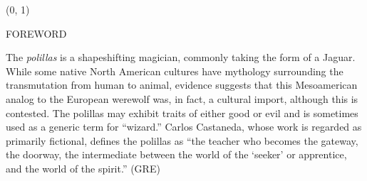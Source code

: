 \documentclass[11pt]{article}
\begin{document}
\begin{textblock}{23}(0, 1)
\begin{center}
\huge FOREWORD
\end{center}
\end{textblock}

\vspace*{0.25\baselineskip}

\begingroup
\begin{center}
The \textit{polillas} is a shapeshifting magician, commonly taking the form of a Jaguar. While some native North American cultures have mythology surrounding the transmutation from human to animal, evidence suggests that this Mesoamerican analog to the European werewolf was, in fact, a cultural import, although this is contested. The polillas may exhibit traits of either good or evil and is sometimes used as a generic term for ``wizard.'' Carlos Castaneda, whose work is regarded as primarily fictional, defines the polillas as ``the teacher who becomes the gateway, the doorway, the intermediate between the world of the `seeker' or apprentice, and the world of the spirit.''
\rightskip\leftskip
\phantom{text} \hfill (GRE)
\end{center}
\endgroup
\end{document}

